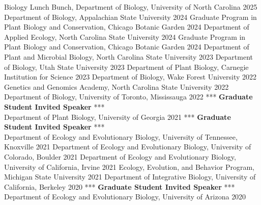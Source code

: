 \documentclass[11pt,english]{article}
\providecommand{\tabularnewline}{\\}
\begin{document}
Biology Lunch Bunch, Department of Biology, University of North Carolina \hfill{2025} \newline
Department of Biology, Appalachian State University \hfill{2024} \newline
Graduate Program in Plant Biology and Conservation, Chicago Botanic Garden \hfill{2024} \newline
Department of Applied Ecology, North Carolina State University \hfill{2024} \newline
Graduate Program in Plant Biology and Conservation, Chicago Botanic Garden \hfill{2024} \newline
Department of Plant and Microbial Biology, North Carolina State University \hfill{2023} \newline
Department of Biology, Utah State University \hfill{2023} \newline
Department of Plant Biology, Carnegie Institution for Science \hfill{2023} \newline
Department of Biology, Wake Forest University \hfill{2022} \newline
Genetics and Genomics Academy, North Carolina State University \hfill{2022} \newline
Department of Biology, University of Toronto, Mississauga \hfill{2022} \newline
\hspace{7mm} *** \textbf{Graduate Student Invited Speaker} *** \tabularnewline
Department of Plant Biology, University of Georgia \hfill{2021} \newline
\hspace{7mm} *** \textbf{Graduate Student Invited Speaker} *** \tabularnewline
Department of Ecology and Evolutionary Biology, University of Tennessee, Knoxville \hfill{2021} \newline
Department of Ecology and Evolutionary Biology, University of Colorado, Boulder \hfill{2021} \newline
Department of Ecology and Evolutionary Biology, University of California, Irvine \hfill{2021} \newline
Ecology, Evolution, and Behavior Program, Michigan State University \hfill{2021} \newline
Department of Integrative Biology, University of California, Berkeley \hfill{2020} \newline
\hspace{7mm} *** \textbf{Graduate Student Invited Speaker} *** \tabularnewline
Department of Ecology and Evolutionary Biology, University of Arizona \hfill{2020} \newline
\end{document}

